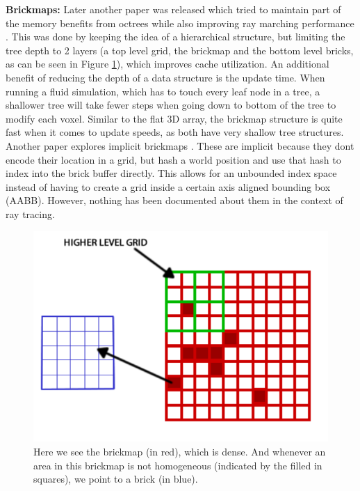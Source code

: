 \noindent\textbf{Brickmaps:} Later another paper was released which tried to maintain part of the memory benefits from octrees while also improving ray marching performance \cite{van2015real}. This was done by keeping the idea of a hierarchical structure, but limiting the tree depth to 2 layers (a top level grid, the brickmap and the bottom level bricks, as can be seen in Figure \ref{fig:brickmap}), which improves cache utilization. An additional benefit of reducing the depth of a data structure is the update time. When running a fluid simulation, which has to touch every leaf node in a tree, a shallower tree will take fewer steps when going down to bottom of the tree to modify each voxel. Similar to the flat 3D array, the brickmap structure is quite fast when it comes to update speeds, as both have very shallow tree structures. Another paper explores implicit brickmaps \cite{niessner2013real}. These are implicit because they dont encode their location in a grid, but hash a world position and use that hash to index into the brick buffer directly. This allows for an unbounded index space instead of having to create a grid inside a certain axis aligned bounding box (AABB). However, nothing has been documented about them in the context of ray tracing.

\begin{figure}[H]
    \centering
    \includegraphics[width=0.9\linewidth]{figures/brickmap.png}
    \caption{Here we see the brickmap (in red), which is dense. And whenever an area in this brickmap is not homogeneous (indicated by the filled in squares), we point to a brick (in blue). \cite{van2015real}}
    \label{fig:brickmap}
\end{figure}

